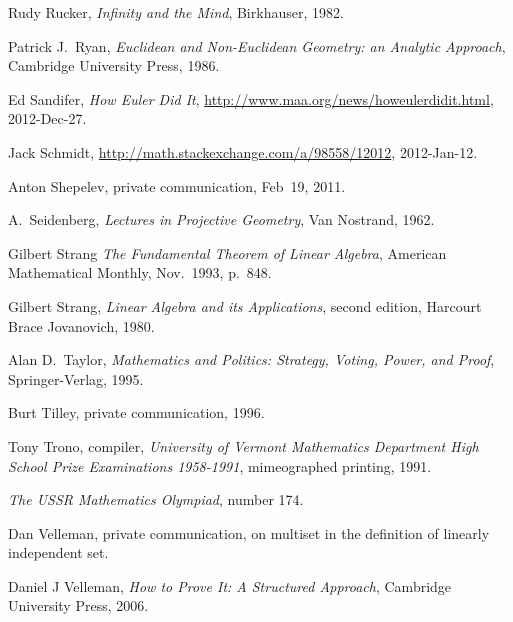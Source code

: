 \begin{thebibliography}{\makebox[2em][c]{{}\hfil{}}}

  Rudy Rucker,
  \emph{Infinity and the Mind},
  Birkhauser,
  1982.

  Patrick J.~Ryan,
  \emph{Euclidean and Non-Euclidean Geometry: an Analytic Approach},
  Cambridge University Press, 1986.

  Ed Sandifer,
  \textit{How Euler Did It},
  \url{http://www.maa.org/news/howeulerdidit.html},
  2012-Dec-27.

  Jack Schmidt, %
  \url{http://math.stackexchange.com/a/98558/12012}, 
  2012-Jan-12.

  Anton Shepelev,
  private communication,
  Feb~19, 2011.

  A.~Seidenberg,
  \emph{Lectures in Projective Geometry},
  Van Nostrand, 1962.


  Gilbert Strang
  \emph{The Fundamental Theorem of Linear Algebra},
  American Mathematical Monthly,
  Nov.~1993, p.~848.

  Gilbert Strang,
  \emph{Linear Algebra and its Applications},
  second edition,
  Harcourt Brace Jovanovich,
  1980.

  Alan D.~Taylor,
  \emph{Mathematics and Politics: Strategy, Voting, Power, and Proof},
  Springer-Verlag,
  1995.

  Burt Tilley,
  private communication,
  1996.

  Tony Trono, compiler,
  \emph{University of Vermont Mathematics Department High School Prize
    Examinations 1958-1991},
  mimeographed printing, 1991.

  \emph{The USSR Mathematics Olympiad},
   number 174.

  Dan Velleman,
  private communication, on multiset in the definition of
  linearly independent set.

  Daniel J Velleman,
  \textit{How to Prove It: A Structured Approach},
  Cambridge University Press,
  2006.


\end{thebibliography}
